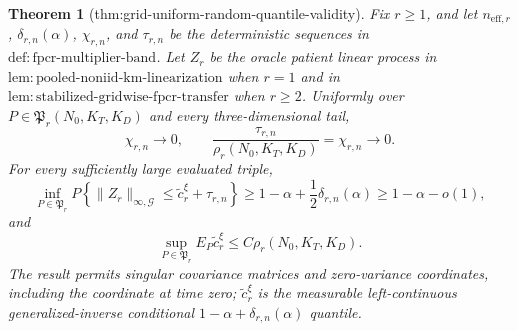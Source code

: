 \documentclass{article}
\newtheorem{theorem}{Theorem}
\begin{document}
\begin{theorem}[thm:grid-uniform-random-quantile-validity]\label{thm:grid-uniform-random-quantile-validity}
Fix \(r\ge1\), and let \(n_{\mathrm{eff},r}\), \(\delta_{r,n}(\alpha)\), \(\chi_{r,n}\), and \(\tau_{r,n}\) be the deterministic sequences in \(\mathrm{def:fpcr\mbox{-}multiplier\mbox{-}band}\). Let \(Z_r\) be the oracle patient linear process in \(\mathrm{lem:pooled\mbox{-}noniid\mbox{-}km\mbox{-}linearization}\) when \(r=1\) and in \(\mathrm{lem:stabilized\mbox{-}gridwise\mbox{-}fpcr\mbox{-}transfer}\) when \(r\ge2\). Uniformly over \(P\in\mathfrak P_r(N_0,K_T,K_D)\) and every three-dimensional tail,
\[
 \chi_{r,n}\longrightarrow0,
 \qquad
 \frac{\tau_{r,n}}{\rho_r(N_0,K_T,K_D)}=\chi_{r,n}\longrightarrow0.
\]
For every sufficiently large evaluated triple,
\[
 \inf_{P\in\mathfrak P_r}
 P\left\{\|Z_r\|_{\infty,\mathcal G}
 \le \widetilde c_r^\xi+\tau_{r,n}\right\}
 \ge 1-\alpha+\frac12\delta_{r,n}(\alpha)
 \ge1-\alpha-o(1),
\]
and
\[
 \sup_{P\in\mathfrak P_r}E_P\widetilde c_r^\xi
 \le C\rho_r(N_0,K_T,K_D).
\]
The result permits singular covariance matrices and zero-variance coordinates, including the coordinate at time zero; \(\widetilde c_r^\xi\) is the measurable left-continuous generalized-inverse conditional \(1-\alpha+\delta_{r,n}(\alpha)\) quantile.
\end{theorem}
\end{document}
